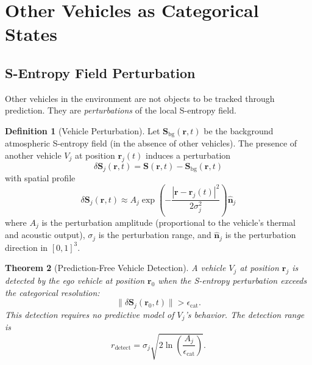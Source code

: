 \documentclass[twocolumn,10pt]{article}
\newtheorem{theorem}{Theorem}[section]
\theoremstyle{definition}
\newtheorem{definition}[theorem]{Definition}
\theoremstyle{remark}
\newcommand{\Sent}{\mathbf{S}}
\begin{document}
\section{Other Vehicles as Categorical States}\label{sec:other-vehicles}

\subsection{S-Entropy Field Perturbation}

Other vehicles in the environment are not objects to be tracked through
prediction. They are \emph{perturbations} of the local S-entropy field.

\begin{definition}[Vehicle Perturbation]\label{def:vehicle-perturbation}
Let $\Sent_{\mathrm{bg}}(\mathbf{r}, t)$ be the background atmospheric
S-entropy field (in the absence of other vehicles). The presence of another
vehicle $V_j$ at position $\mathbf{r}_j(t)$ induces a perturbation
\begin{equation}\label{eq:perturbation}
  \delta \Sent_j(\mathbf{r}, t) = \Sent(\mathbf{r}, t)
  - \Sent_{\mathrm{bg}}(\mathbf{r}, t)
\end{equation}
with spatial profile
\begin{equation}\label{eq:perturbation-profile}
  \delta \Sent_j(\mathbf{r}, t) \approx
  A_j \exp\!\left(-\frac{|\mathbf{r} - \mathbf{r}_j(t)|^2}{2\sigma_j^2}\right)
  \hat{\mathbf{n}}_j
\end{equation}
where $A_j$ is the perturbation amplitude (proportional to the vehicle's
thermal and acoustic output), $\sigma_j$ is the perturbation range, and
$\hat{\mathbf{n}}_j$ is the perturbation direction in $[0,1]^3$.
\end{definition}

\begin{theorem}[Prediction-Free Vehicle Detection]\label{thm:detection}
A vehicle $V_j$ at position $\mathbf{r}_j$ is detected by the ego vehicle
at position $\mathbf{r}_0$ when the S-entropy perturbation exceeds the
categorical resolution:
\begin{equation}\label{eq:detection-condition}
  \|\delta \Sent_j(\mathbf{r}_0, t)\| > \epsilon_{\mathrm{cat}}.
\end{equation}
This detection requires no predictive model of $V_j$'s behavior. The
detection range is
\begin{equation}\label{eq:detection-range}
  r_{\mathrm{detect}} = \sigma_j
  \sqrt{2 \ln\!\left(\frac{A_j}{\epsilon_{\mathrm{cat}}}\right)}.
\end{equation}
\end{theorem}
\end{document}
